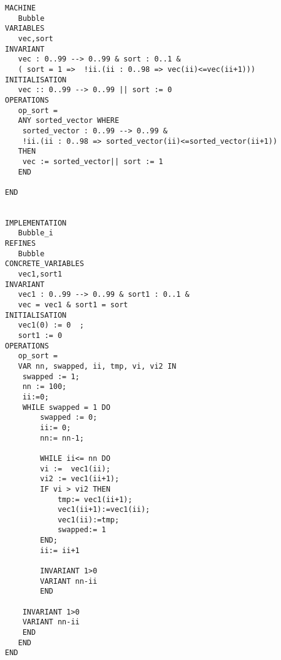 \documentclass[10pt,a4paper]{article}
\begin{document}
\begin{footnotesize}
\begin{verbatim}
MACHINE
   Bubble
VARIABLES
   vec,sort
INVARIANT
   vec : 0..99 --> 0..99 & sort : 0..1 &
   ( sort = 1 =>  !ii.(ii : 0..98 => vec(ii)<=vec(ii+1)))
INITIALISATION
   vec :: 0..99 --> 0..99 || sort := 0
OPERATIONS
   op_sort =
   ANY sorted_vector WHERE
    sorted_vector : 0..99 --> 0..99 &
    !ii.(ii : 0..98 => sorted_vector(ii)<=sorted_vector(ii+1))
   THEN
    vec := sorted_vector|| sort := 1
   END

END


IMPLEMENTATION
   Bubble_i
REFINES
   Bubble
CONCRETE_VARIABLES
   vec1,sort1
INVARIANT
   vec1 : 0..99 --> 0..99 & sort1 : 0..1 &
   vec = vec1 & sort1 = sort
INITIALISATION
   vec1(0) := 0  ;
   sort1 := 0
OPERATIONS
   op_sort =
   VAR nn, swapped, ii, tmp, vi, vi2 IN
	swapped := 1;
	nn := 100;
	ii:=0;
	WHILE swapped = 1 DO
		swapped := 0;
		ii:= 0;
		nn:= nn-1;

		WHILE ii<= nn DO
		vi :=  vec1(ii);
		vi2 := vec1(ii+1);
		IF vi > vi2 THEN
			tmp:= vec1(ii+1);
			vec1(ii+1):=vec1(ii);
			vec1(ii):=tmp;
			swapped:= 1
		END;
		ii:= ii+1

		INVARIANT 1>0
		VARIANT nn-ii
		END

	INVARIANT 1>0
	VARIANT nn-ii
	END
   END
END


\end{verbatim}
\end{footnotesize}
\end{document}
